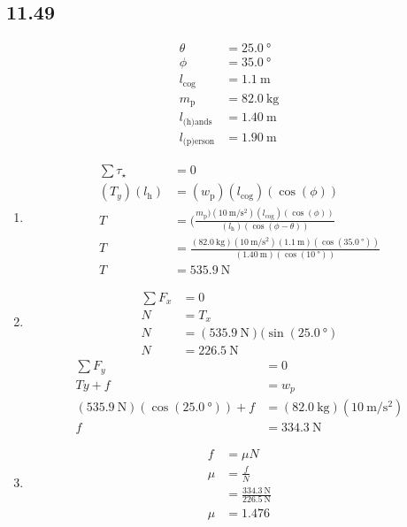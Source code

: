 \documentclass{article}
\begin{document}
\subsection{11.49}
\begin{align*}
	\theta & = \SI{25.0}{\degree} \\
	\phi & = \SI{35.0}{\degree} \\
	l_\text{cog} & = \SI{1.1}{\meter} \\
	m_{\text{p}} & = \SI{82.0}{\kilogram} \\
	l_\text{(h)ands} & = \SI{1.40}{\meter} \\
	l_\text{(p)erson} & = \SI{1.90}{\meter}
\end{align*}
\begin{enumerate}[label=\textbf{(\alph*)}]
	\item
		\begin{align*}
			\sum \tau_\star & = 0 \\
			(T_y)(l_\text{h}) & = (w_\text{p})(l_\text{cog})(\cos(\phi)) \\
			T & = (\frac{m_\text{p})(\SI{10}{\meter \per \second \squared})(l_\text{cog})(\cos(\phi))}{(l_\text{h})(\cos(\phi - \theta))} \\
			T & = \frac{(\SI{82.0}{\kilogram})(\SI{10}{\meter \per \second \squared})(\SI{1.1}{\meter})(\cos(\SI{35.0}{\degree}))}{(\SI{1.40}{\meter})(\cos(\SI{10}{\degree}))} \\
			T & = \SI{535.9}{\newton}
		\end{align*}
	\item
		\begin{align*}
			\sum F_x & = 0 \\
			N & = T_x \\
			N & = (\SI{535.9}{\newton})(\sin(\SI{25.0}{\degree}) \\
			N & = \SI{226.5}{\newton}
		\end{align*}
		\begin{align*}
			\sum F_y & = 0 \\
			Ty + f & = w_p \\
			(\SI{535.9}{\newton})(\cos(\SI{25.0}{\degree})) + f & = (\SI{82.0}{\kilogram})(\SI{10}{\meter \per \second \squared}) \\
			f & = \SI{334.3}{\newton}
		\end{align*}
	\item
		\begin{align*}
			f & = \mu N \\
			\mu & = \frac{f}{N} \\
				& = \frac{\SI{334.3}{\newton}}{\SI{226.5}{\newton}} \\
			\mu & = 1.476
		\end{align*}
\end{enumerate}
\end{document}
